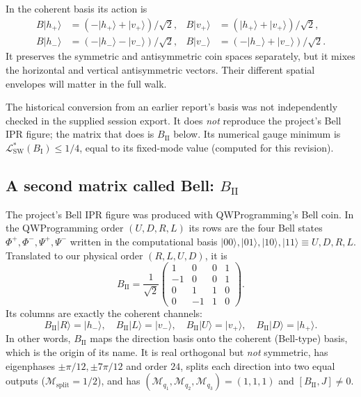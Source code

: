 \documentclass[11pt,a4paper,oneside]{report}
\newcommand{\ket}[1]{\lvert #1\rangle}
\newcommand{\sw}{\mathrm{SW}}
\numberwithin{equation}{chapter}
\begin{document}
In the coherent basis its action is
\begin{align}
B\ket{h_+}&=(-\ket{h_+}+\ket{v_+})/\sqrt2,&
B\ket{v_+}&=(\ket{h_+}+\ket{v_+})/\sqrt2,\\
B\ket{h_-}&=(-\ket{h_-}-\ket{v_-})/\sqrt2,&
B\ket{v_-}&=(-\ket{h_-}+\ket{v_-})/\sqrt2.
\end{align}
It preserves the symmetric and antisymmetric coin spaces separately,
but it mixes the horizontal and vertical antisymmetric vectors.
Their different spatial envelopes will matter in the full walk.

The historical conversion from an earlier report's basis was not
independently checked in the supplied session export. It does \emph{not}
reproduce the project's Bell IPR figure; the matrix that does is
\(B_{\mathrm{II}}\) below. Its numerical gauge minimum is
\(\mathcal L^*_{\sw}(B_{\mathrm I})\le1/4\), equal to its fixed-mode value
(computed for this revision).

\subsection{A second matrix called Bell: \(B_{\mathrm{II}}\)}
\label{sec:bellII}

The project's Bell IPR figure was produced with QWProgramming's Bell
coin. In the QWProgramming order \((U,D,R,L)\) its rows are the four Bell
states \(\Phi^+,\Phi^-,\Psi^+,\Psi^-\) written in the computational basis
\(\ket{00},\ket{01},\ket{10},\ket{11}\equiv U,D,R,L\). Translated to our
physical order \((R,L,U,D)\), it is
\begin{equation}
\boxed{
B_{\mathrm{II}}=\frac1{\sqrt2}
\begin{pmatrix}
1&0&0&1\\
-1&0&0&1\\
0&1&1&0\\
0&-1&1&0
\end{pmatrix}.
}
\end{equation}
Its columns are exactly the coherent channels:
\begin{equation}
B_{\mathrm{II}}\ket R=\ket{h_-},\quad
B_{\mathrm{II}}\ket L=\ket{v_-},\quad
B_{\mathrm{II}}\ket U=\ket{v_+},\quad
B_{\mathrm{II}}\ket D=\ket{h_+}.
\end{equation}
In other words, \(B_{\mathrm{II}}\) maps the direction basis onto the
coherent (Bell-type) basis, which is the origin of its name. It is real
orthogonal but \emph{not} symmetric, has eigenphases
\(\pm\pi/12,\pm7\pi/12\) and order \(24\), splits each direction into two
equal outputs (\(\mathcal M_{\mathrm{split}}=1/2\)), and has
\((\mathcal M_{q_1},\mathcal M_{q_2},\mathcal M_{q_3})=(1,1,1)\) and
\([B_{\mathrm{II}},J]\ne0\).
\end{document}
